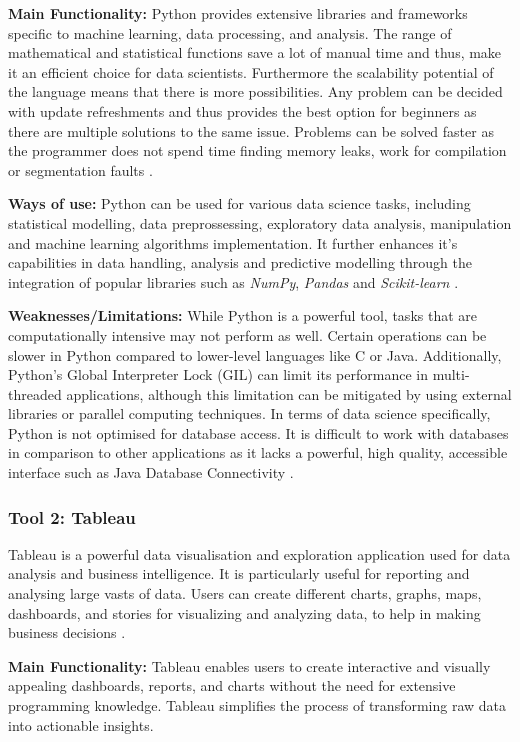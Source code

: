 \documentclass[a4paper, 11pt]{report}
\begin{document}
\textbf{Main Functionality:} Python provides extensive libraries and frameworks specific to machine learning, data processing, and analysis. The range of mathematical and statistical functions save a lot of manual time and thus, make it an efficient choice for data scientists. Furthermore the scalability potential of the language means that there is more possibilities. Any problem can be decided with update refreshments and thus provides the best option for beginners as there are multiple solutions to the same issue. Problems can be solved faster as the programmer does not spend time finding memory leaks, work for compilation or segmentation faults \cite{python1}.

\textbf{Ways of use:} Python can be used for various data science tasks, including statistical modelling, data preprossessing, exploratory data analysis, manipulation and machine learning algorithms implementation. It further enhances it's capabilities in data handling, analysis and predictive modelling through the integration of popular libraries such as \emph{NumPy}, \emph{Pandas} and \emph{Scikit-learn} \cite{python2}. 

\textbf{Weaknesses/Limitations:} While Python is a powerful tool, tasks that are computationally intensive may not perform as well. Certain operations can be slower in Python compared to lower-level languages like C or Java. Additionally, Python's Global Interpreter Lock (GIL) can limit its performance in multi-threaded applications, although this limitation can be mitigated by using external libraries or parallel computing techniques. In terms of data science specifically, Python is not optimised for database access. It is difficult to work with databases in comparison to other applications as it lacks a powerful, high quality, accessible interface such as Java Database Connectivity \cite{python3}. 

\subsubsection{Tool 2: Tableau}
Tableau is a powerful data visualisation and exploration application used for data analysis and business intelligence. It is particularly useful for reporting and analysing large vasts of data. Users can create different charts, graphs, maps, dashboards, and stories for visualizing and analyzing data, to help in making business decisions \cite{tableau}.

\textbf{Main Functionality:} Tableau enables users to create interactive and visually appealing dashboards, reports, and charts without the need for extensive programming knowledge. Tableau simplifies the process of transforming raw data into actionable insights.
\end{document}

